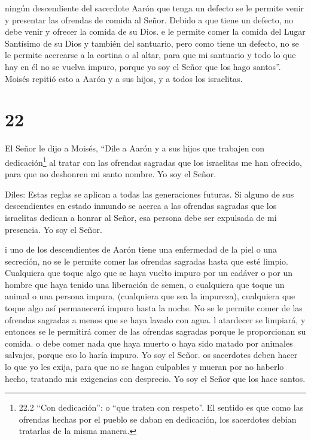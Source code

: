  ningún descendiente del sacerdote Aarón que tenga un
defecto se le permite venir y presentar las ofrendas de comida al Señor.
Debido a que tiene un defecto, no debe venir y ofrecer la comida de su
Dios.  e le permite comer la comida del Lugar Santísimo de
su Dios y también del santuario,  pero como tiene un
defecto, no se le permite acercarse a la cortina o al altar, para que mi
santuario y todo lo que hay en él no se vuelva impuro, porque yo soy el
Señor que los hago santos''.  Moisés repitió esto a Aarón y
a sus hijos, y a todos los israelitas.

\hypertarget{section-21}{%
\section{22}\label{section-21}}

 El Señor le dijo a Moisés,  ``Dile a Aarón y a
sus hijos que trabajen con dedicación\footnote{22.2 ``Con dedicación'':
  o ``que traten con respeto''. El sentido es que como las ofrendas
  hechas por el pueblo se daban en dedicación, los sacerdotes debían
  tratarlas de la misma manera.} al tratar con las ofrendas sagradas que
los israelitas me han ofrecido, para que no deshonren mi santo nombre.
Yo soy el Señor.

 Diles: Estas reglas se aplican a todas las generaciones
futuras. Si alguno de sus descendientes en estado inmundo se acerca a
las ofrendas sagradas que los israelitas dedican a honrar al Señor, esa
persona debe ser expulsada de mi presencia. Yo soy el Señor.

 i uno de los descendientes de Aarón tiene una enfermedad de
la piel o una secreción, no se le permite comer las ofrendas sagradas
hasta que esté limpio. Cualquiera que toque algo que se haya vuelto
impuro por un cadáver o por un hombre que haya tenido una liberación de
semen,  o cualquiera que toque un animal o una persona
impura, (cualquiera que sea la impureza),  cualquiera que
toque algo así permanecerá impuro hasta la noche. No se le permite comer
de las ofrendas sagradas a menos que se haya lavado con agua.
 l atardecer se limpiará, y entonces se le permitirá comer
de las ofrendas sagradas porque le proporcionan su comida. 
o debe comer nada que haya muerto o haya sido matado por animales
salvajes, porque eso lo haría impuro. Yo soy el Señor.  os
sacerdotes deben hacer lo que yo les exija, para que no se hagan
culpables y mueran por no haberlo hecho, tratando mis exigencias con
desprecio. Yo soy el Señor que los hace santos.

